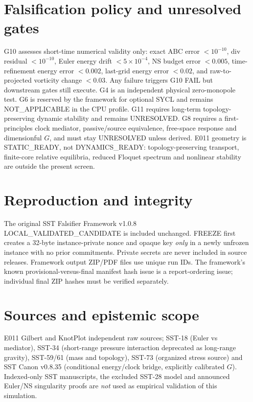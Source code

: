 \documentclass[10pt,a4paper]{article}
\begin{document}
\section{Falsification policy and unresolved gates}
G10 assesses short-time numerical validity only: exact ABC error $<10^{-10}$, div residual $<10^{-10}$, Euler energy drift $<5\times10^{-4}$, NS budget error $<0.005$, time-refinement energy error $<0.002$, last-grid energy error $<0.02$, and raw-to-projected vorticity change $<0.03$. Any failure triggers G10 FAIL but downstream gates still execute. G4 is an independent physical zero-monopole test. G6 is reserved by the framework for optional SYCL and remains NOT\_APPLICABLE in the CPU profile. G11 requires long-term topology-preserving dynamic stability and remains UNRESOLVED. G8 requires a first-principles clock mediator, passive/source equivalence, free-space response and dimensionful $G$, and must stay UNRESOLVED unless derived. E011 geometry is STATIC\_READY, not DYNAMICS\_READY: topology-preserving transport, finite-core relative equilibria, reduced Floquet spectrum and nonlinear stability are outside the present screen.

\section{Reproduction and integrity}
The original SST Falsifier Framework v1.0.8 LOCAL\_VALIDATED\_CANDIDATE is included unchanged. FREEZE first creates a 32-byte instance-private nonce and opaque key \emph{only} in a newly unfrozen instance with no prior commitments. Private secrets are never included in source releases. Framework output ZIP/PDF files use unique run IDs. The framework's known provisional-versus-final manifest hash issue is a report-ordering issue; individual final ZIP hashes must be verified separately.

\section{Sources and epistemic scope}
E011 Gilbert and KnotPlot independent raw sources; SST-18 (Euler vs mediator), SST-34 (short-range pressure interaction deprecated as long-range gravity), SST-59/61 (mass and topology), SST-73 (organized stress source) and SST Canon v0.8.35 (conditional energy/clock bridge, explicitly calibrated $G$). Indexed-only SST manuscripts, the excluded SST-28 model and announced Euler/NS singularity proofs are \emph{not} used as empirical validation of this simulation.
\end{document}
